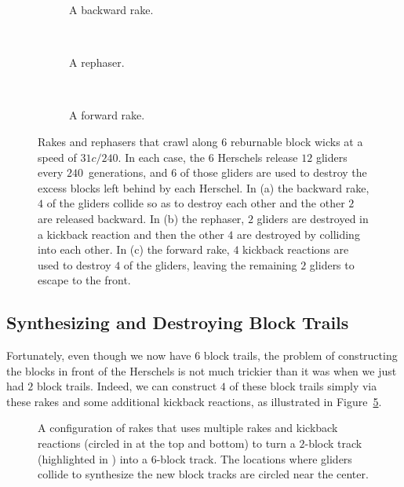\begin{figure}[!htb]
	\centering
	\begin{subfigure}{0.28\textwidth}
		\centering
		\caption{A backward rake.}\label{fig:31c_240_back_rake}
	\end{subfigure} \ \ \begin{subfigure}{0.28\textwidth}
		\centering
		\caption{A rephaser.}\label{fig:31c_240_rephaser}
	\end{subfigure} \ \ \begin{subfigure}{0.4\textwidth}
		\centering
		\caption{A forward rake.}\label{fig:31c_240_forward_rake}
	\end{subfigure}
	\caption{Rakes and rephasers that crawl along $6$ reburnable block wicks at a speed of $31c/240$. In each case, the $6$ Herschels release $12$ gliders every $240$~generations, and $6$ of those gliders are used to destroy the excess blocks left behind by each Herschel. In (a) the backward rake, $4$ of the gliders collide so as to destroy each other and the other $2$ are released backward. In (b) the rephaser, $2$ gliders are destroyed in a kickback reaction and then the other $4$ are destroyed by colliding into each other. In (c) the forward rake, $4$ kickback reactions are used to destroy $4$ of the gliders, leaving the remaining $2$ gliders to escape to the front.}\label{fig:31c_240_rakes_and_rephaser}
\end{figure}


\subsection{Synthesizing and Destroying Block Trails}\label{sec:silverfish_synth_destroy_blocks}

Fortunately, even though we now have $6$ block trails, the problem of constructing the blocks in front of the Herschels is not much trickier than it was when we just had $2$ block trails. Indeed, we can construct $4$ of these block trails simply via these rakes and some additional kickback reactions, as illustrated in Figure~\ref{fig:31c_240_track_builder}.

\begin{figure}[!htb]
	\centering
	\caption{A configuration of rakes that uses multiple rakes and kickback reactions (circled in  at the top and bottom) to turn a $2$-block track (highlighted in ) into a $6$-block track. The locations where gliders collide to synthesize the new block tracks are circled near the center.}\label{fig:31c_240_track_builder}
\end{figure}

